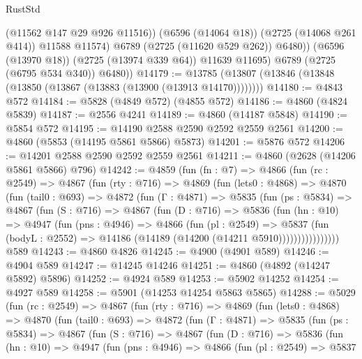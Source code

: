 \begin{lexlean}{RustStd}
\begin{coremodule}
                  (@11562 @147 @29 @926 @11516))
                (@6596 (@14064 @18))
                (@2725 (@14068 @261 @414))
                @11588
                @11574)
              @6789
              (@2725 (@11620 @529 @262))
              @6480))
          (@6596 (@13970 @18))
          (@2725 (@13974 @339 @64))
          @11639
          @11695)
        @6789
        (@2725 (@6795 @534 @340))
        @6480))
@14179 := @13785 (@13807 (@13846 (@13848 (@13850 (@13867 (@13883 (@13900 (@13913 @14170))))))))
@14180 := @4843 @572
@14184 := @5828 (@4849 @572) (@4855 @572)
@14186 := @4860 (@4824 @5839)
@14187 := @2556 @4241
@14189 := @4860 (@14187 @5848)
@14190 := @5854 @572
@14195 := @14190 @2588 @2590 @2592 @2559 @2561
@14200 := @4860 (@5853 (@14195 @5861 @5866) @5873)
@14201 := @5876 @572
@14206 := @14201 @2588 @2590 @2592 @2559 @2561
@14211 := @4860 (@2628 (@14206 @5861 @5866) @796)
@14242 := @4859
    (fun (fn : @7) =>
    @4866
      (fun (rc : @2549) =>
      @4867
        (fun (rty : @716) =>
        @4869
          (fun (lets0 : @4868) =>
          @4870
            (fun (tail0 : @693) =>
            @4872
              (fun (Γ : @4871) =>
              @5835
                (fun (ps : @5834) =>
                @4867
                  (fun (S : @716) =>
                  @4867
                    (fun (D : @716) =>
                    @5836
                      (fun (hn : @10) =>
                      @4947
                        (fun (pns : @4946) =>
                        @4866
                          (fun (pl : @2549) =>
                          @5837
                            (fun (bodyL : @2552) =>
                            @14186 (@14189 (@14200 (@14211 @5910))))))))))))))))
    @589
@14243 := @4860 @4826
@14245 := @4900 (@4901 @589)
@14246 := @4904 @589
@14247 := @14245 @14246
@14251 := @4860 (@4892 (@14247 @5892) @5896)
@14252 := @4924 @589
@14253 := @5902 @14252
@14254 := @4927 @589
@14258 := @5901 (@14253 @14254 @5863 @5865)
@14288 := @5029
    (fun (rc : @2549) =>
    @4867
      (fun (rty : @716) =>
      @4869
        (fun (lets0 : @4868) =>
        @4870
          (fun (tail0 : @693) =>
          @4872
            (fun (Γ : @4871) =>
            @5835
              (fun (ps : @5834) =>
              @4867
                (fun (S : @716) =>
                @4867
                  (fun (D : @716) =>
                  @5836
                    (fun (hn : @10) =>
                    @4947
                      (fun (pns : @4946) =>
                      @4866
                        (fun (pl : @2549) =>
                        @5837

\end{coremodule}
\end{lexlean}
